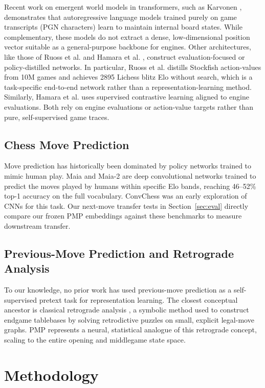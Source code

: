 \documentclass[journal]{IEEEtran}
\begin{document}
Recent work on emergent world models in transformers, such as Karvonen \cite{ref-karvonen}, demonstrates that autoregressive language models trained purely on game transcripts (PGN characters) learn to maintain internal board states. While complementary, these models do not extract a dense, low-dimensional position vector suitable as a general-purpose backbone for engines. Other architectures, like those of Ruoss et al. \cite{ref-ruoss} and Hamara et al. \cite{ref-contrastive-chess}, construct evaluation-focused or policy-distilled networks. In particular, Ruoss et al. distills Stockfish action-values from 10M games and achieves 2895 Lichess blitz Elo without search, which is a task-specific end-to-end network rather than a representation-learning method. Similarly, Hamara et al. uses supervised contrastive learning aligned to engine evaluations. Both rely on engine evaluations or action-value targets rather than pure, self-supervised game traces.

\subsection{Chess Move Prediction}
Move prediction has historically been dominated by policy networks trained to mimic human play. Maia \cite{ref-maia} and Maia-2 \cite{ref-maia2} are deep convolutional networks trained to predict the moves played by humans within specific Elo bands, reaching 46--52\% top-1 accuracy on the full vocabulary. ConvChess \cite{ref-convchess} was an early exploration of CNNs for this task. Our next-move transfer tests in Section~\ref{sec:eval} directly compare our frozen PMP embeddings against these benchmarks to measure downstream transfer.

\subsection{Previous-Move Prediction and Retrograde Analysis}
To our knowledge, no prior work has used previous-move prediction as a self-supervised pretext task for representation learning. The closest conceptual ancestor is classical retrograde analysis \cite{ref-retro}, a symbolic method used to construct endgame tablebases by solving retrodictive puzzles on small, explicit legal-move graphs. PMP represents a neural, statistical analogue of this retrograde concept, scaling to the entire opening and middlegame state space.

\section{Methodology}
\end{document}

